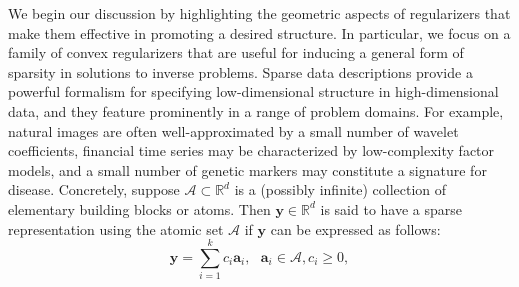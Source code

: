 \documentclass[11pt,letterpaper]{article}
\newcommand{\R}{\mathbb{R}}
\newcommand{\A}{\mathcal{A}}
\newcommand{\ba}{\mathbf{a}}
\newcommand{\by}{\mathbf{y}}
\begin{document}

We begin our discussion by highlighting the geometric aspects of regularizers that make them effective in promoting a desired structure.  In particular, we focus on a family of convex regularizers that are useful for inducing a general form of sparsity in solutions to inverse problems.  Sparse data descriptions provide a powerful formalism for specifying low-dimensional structure in high-dimensional data, and they feature prominently in a range of problem domains.  For example, natural images are often well-approximated by a small number of wavelet coefficients, financial time series may be characterized by low-complexity factor models, and a small number of genetic markers may constitute a signature for disease.  Concretely, suppose $\A \subset \R^d$ is a (possibly infinite) collection of elementary building blocks or atoms.  Then $\by \in \R^d$ is said to have a sparse representation using the atomic set $\A$ if $\by$ can be expressed as follows:
\begin{equation*}
\by = \sum_{i=1}^k c_i \ba_i, ~~~ \ba_i \in \A, c_i \geq 0,
\end{equation*}
\end{document}
